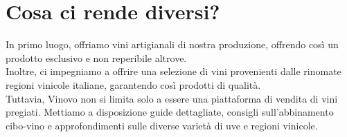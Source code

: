 \documentclass[12pt, a4paper]{article}
\newcommand{\meskip}{\medskip \\}
\begin{document}
\section*{Cosa ci rende diversi?}
In primo luogo, offriamo vini artigianali di nostra produzione, offrendo così un prodotto esclusivo e non reperibile altrove.\\
Inoltre, ci impegniamo a offrire una selezione di vini provenienti dalle rinomate regioni vinicole italiane, garantendo così prodotti di qualità.\meskip
Tuttavia, Vinovo non si limita solo a essere una piattaforma di vendita di vini pregiati.
Mettiamo a disposizione guide dettagliate, consigli sull'abbinamento cibo-vino e approfondimenti sulle diverse varietà di uve e regioni vinicole.
\end{document}
